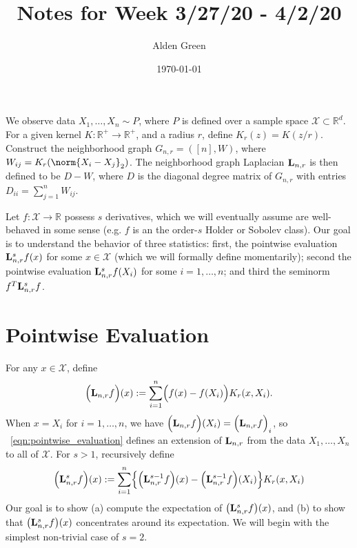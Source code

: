 \documentclass{article}
\newcommand{\Reals}{\mathbb{R}}
\newcommand{\1}{\mathbf{1}}
\newcommand{\Lap}{{\bf L}}
\newcommand{\Xset}{\mathcal{X}}
\theoremstyle{alden}
\theoremstyle{aldenthm}
\theoremstyle{definition}
\theoremstyle{remark}
\begin{document}
\title{Notes for Week 3/27/20 - 4/2/20}
\author{Alden Green}
\date{\today}
\maketitle

We observe data $X_1,\ldots,X_n \sim P$, where $P$ is defined over a sample space $\Xset \subset \Reals^d$. For a given kernel $K: \Reals^+ \to \Reals^+$, and a radius $r$, define $K_r(z) = K(z/r)$. Construct the neighborhood graph $G_{n,r} = ([n],W)$, where $W_{ij} = K_r(\norm{X_i - X_j}_2)$. The neighborhood graph Laplacian $\Lap_{n,r}$ is then defined to be $D - W$, where $D$ is the diagonal degree matrix of $G_{n,r}$ with entries $D_{ii} = \sum_{j = 1}^{n} W_{ij}$. 

Let $f: \Xset \to \Reals$ possess $s$ derivatives, which we will eventually assume are well-behaved in some sense (e.g. $f$ is an the order-$s$ Holder or Sobolev class). Our goal is to understand the behavior of three statistics: first, the pointwise evaluation $\Lap_{n,r}^sf(x)$ for some $x \in \Xset$ (which we will formally define momentarily); second the pointwise evaluation $\Lap_{n,r}^sf(X_i)$ for some $i = 1,\ldots,n$; and third the seminorm $f^T \Lap_{n,r}^s f$. 

\section{Pointwise Evaluation}

For any $x \in \Xset$, define
\begin{equation}
\label{eqn:pointwise_evaluation}
\Bigl(\Lap_{n,r}f\Bigr)(x) := \sum_{i = 1}^{n} \Bigl( f(x) - f(X_i) \Bigr) K_r(x,X_i).
\end{equation}
When $x = X_i$ for $i = 1,\ldots,n$, we have $\Bigl(\Lap_{n,r}f\Bigr)(X_i) = \Bigl(\Lap_{n,r}f\Bigr)_i$, so ~\eqref{eqn:pointwise_evaluation} defines an extension of $\Lap_{n,r}$ from the data $X_1,\ldots,X_n$ to all of $\Xset$. For $s > 1$, recursively define
\begin{equation*}
\Bigl(\Lap_{n,r}^s f\Bigr)(x) := \sum_{i = 1}^{n} \Bigl\{\Bigl(\Lap_{n,r}^{s-1}f\Bigr)(x) - \Bigl(\Lap_{n,r}^{s-1}f\Bigr)(X_i)\Bigr\}K_r(x,X_i)
\end{equation*}
Our goal is to show (a) compute the expectation of $\bigl(\Lap_{n,r}^s f\bigr)(x)$, and (b) to show that $\bigl(\Lap_{n,r}^s f\bigr)(x)$ concentrates around its expectation. We will begin with the simplest non-trivial case of $s = 2$. 
\end{document}
